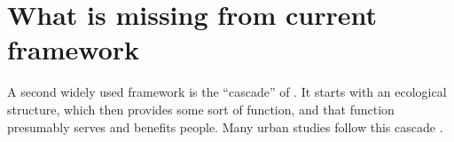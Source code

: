\documentclass[12pt]{article}
\begin{document}

\section{What is missing from current framework}\label{sec:missing}

 A second widely used framework is the ``cascade'' of \citet{haines-youngLinksBiodiversityEcosystem2010}. It starts with an ecological structure, which then provides some sort of function, and that function presumably serves and benefits people. Many urban studies follow this cascade \citep{baro_mapping_2016, veerkampReviewStudiesAssessing2021}.
\end{document}

